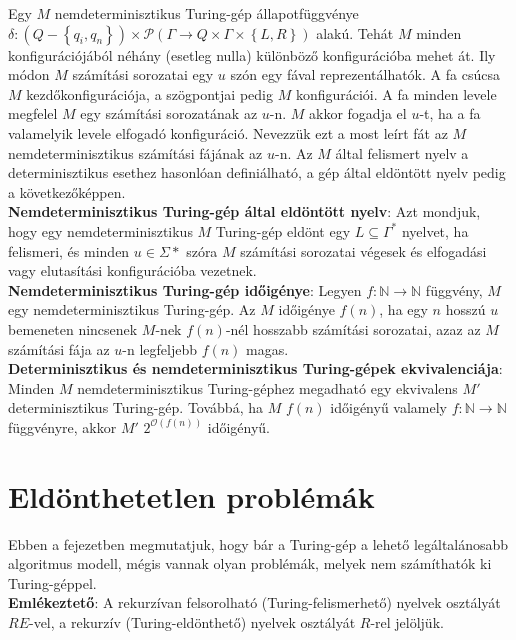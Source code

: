 \documentclass[margin=0px]{article}
\begin{document}
Egy $M$ nemdeterminisztikus Turing-gép állapotfüggvénye
$\delta : (Q - \left\{q_{i},q_{n}\right\}) \times \mathcal{P}(\Gamma \to Q \times \Gamma \times \left\{L, R\right\})$
alakú. Tehát $M$ minden konfigurációjából néhány (esetleg nulla) különböző konfigurációba mehet át.
Ily módon $M$ számítási sorozatai egy $u$ szón egy fával reprezentálhatók. A fa csúcsa $M$ kezdőkonfigurációja,
a szögpontjai pedig	$M$ konfigurációi. A fa minden levele megfelel $M$ egy számítási sorozatának az
$u$-n. $M$ akkor fogadja el $u$-t, ha a fa valamelyik levele elfogadó konfiguráció.
Nevezzük ezt a most leírt fát az $M$ nemdeterminisztikus számítási fájának az
$u$-n. Az $M$ által felismert nyelv a determinisztikus esethez hasonlóan definiálható,
a gép által eldöntött nyelv pedig a következőképpen.\\

\noindent \textbf{Nemdeterminisztikus Turing-gép által eldöntött nyelv}: Azt mondjuk, hogy egy nemdeterminisztikus
$M$ Turing-gép eldönt egy $L \subseteq \Gamma^{*}$ nyelvet, ha felismeri, és minden $u \in \Sigma{*}$ szóra
$M$ számítási sorozatai végesek és elfogadási vagy elutasítási konfigurációba vezetnek.\\

\noindent \textbf{Nemdeterminisztikus Turing-gép időigénye}: Legyen $f : \mathbb{N} \to \mathbb{N}$ függvény, $M$
egy nemdeterminisztikus Turing-gép. Az $M$ időigénye $f(n)$, ha egy $n$ hosszú $u$ bemeneten nincsenek $M$-nek
$f(n)$-nél hosszabb számítási sorozatai, azaz az $M$ számítási fája az $u$-n legfeljebb $f(n)$ magas.\\

\noindent \textbf{Determinisztikus és nemdeterminisztikus Turing-gépek ekvivalenciája}:
Minden $M$ nemdeterminisztikus Turing-géphez megadható egy ekvivalens $M'$ determinisztikus Turing-gép.
Továbbá, ha $M$ $f(n)$ időigényű valamely $f : \mathbb{N} \to \mathbb{N}$ függvényre, akkor
$M'$ $2^{\mathcal{O}(f(n))}$ időigényű.


\section{Eldönthetetlen problémák}

Ebben a fejezetben megmutatjuk, hogy bár a Turing-gép a lehető legáltalánosabb
algoritmus modell, mégis vannak olyan problémák, melyek nem számíthatók ki Turing-géppel.\\

\noindent \textbf{Emlékeztető}: A rekurzívan felsorolható (Turing-felismerhető) nyelvek osztályát $RE$-vel,
a rekurzív (Turing-eldönthető) nyelvek osztályát $R$-rel jelöljük.\\
\end{document}
